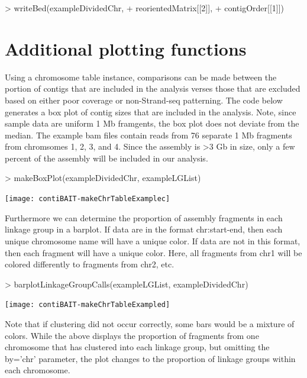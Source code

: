 \documentclass{article}
\begin{document}
\begin{Schunk}
\begin{Sinput}
> writeBed(exampleDividedChr,
+ reorientedMatrix[[2]],
+ contigOrder[[1]])
\end{Sinput}
\end{Schunk}

\newpage
\section{Additional plotting functions}

Using a chromosome table instance, comparisons can be made between the portion of contigs that are included in the analysis verses those that are excluded based on either poor coverage or non-Strand-seq patterning. The code below generates a box plot of contig sizes that are included in the analysis. Note, since sample data are uniform 1 Mb framgents, the box plot does not deviate from the median.  The example bam files contain reads from 76 separate 1 Mb fragments from chromsomes 1, 2, 3, and 4.  Since the assembly is >3 Gb in size, only a few percent of the assembly will be included in our analysis.

\begin{Schunk}
\begin{Sinput}
> makeBoxPlot(exampleDividedChr, exampleLGList)
\end{Sinput}
\end{Schunk}
\texttt{[image: contiBAIT-makeChrTableExamplec]}

\newpage
Furthermore we can determine the proportion of assembly fragments in each linkage group in a barplot. If data are in the format chr:start-end, then each unique chromosome name will have a unique color. If data are not in this format, then each fragment will have a unique color.  Here, all fragments from chr1 will be colored differently to fragments from chr2, etc.

\begin{Schunk}
\begin{Sinput}
> barplotLinkageGroupCalls(exampleLGList, exampleDividedChr)
\end{Sinput}
\end{Schunk}
\texttt{[image: contiBAIT-makeChrTableExampled]}

Note that if clustering did not occur correctly, some bars would be a mixture of colors.  While the above displays the proportion of fragments from one chromosome that has clustered into each linkage group, but omitting the by='chr' parameter, the plot changes to the proportion of linkage groups within each chromosome.
\end{document}
